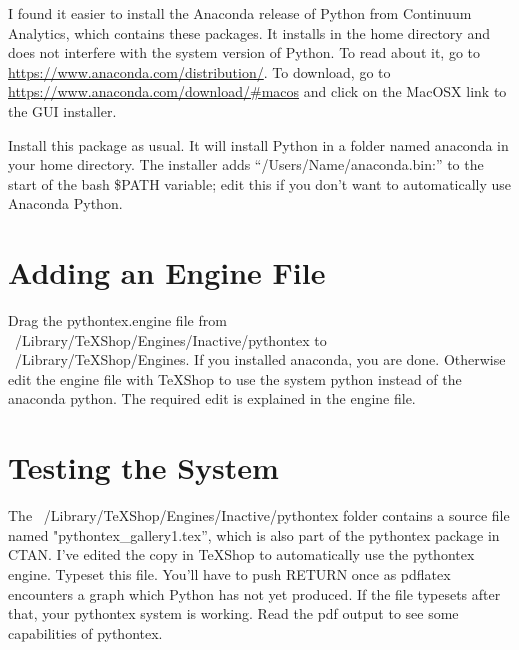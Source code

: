 \documentclass[11pt, oneside]{amsart}
\begin{document}
I found it easier to install the Anaconda release of Python from Continuum Analytics, which contains these packages. It installs in the home directory and does not interfere with the system version of Python. To read about it, go to \href{https://www.anaconda.com/distribution/}{https://www.anaconda.com/distribution/}. To download, go to \href{https://www.anaconda.com/download/\#macos}{https://www.anaconda.com/download/\#macos} and click on the MacOSX link to the GUI installer.

Install  this package as usual. It will install Python in a folder named anaconda in your home directory. The installer adds ``/Users/Name/anaconda.bin:'' to the start of the bash \$PATH variable;
edit this if you don't want to automatically use Anaconda Python.

\section{Adding an Engine File}
Drag the pythontex.engine file from ~/Library/TeXShop/Engines/Inactive/pythontex to ~/Library/TeXShop/Engines. If you installed anaconda, you are done. Otherwise edit the engine file with TeXShop to use the system python instead of the anaconda python. The required edit is explained in the engine file.

\section{Testing the System}
The ~/Library/TeXShop/Engines/Inactive/pythontex folder contains a source file named "pythontex\_gallery1.tex'', which is also part of the pythontex package in CTAN. I've edited
the copy in TeXShop to automatically use the pythontex engine. Typeset this file. You'll
have to push RETURN once as pdflatex encounters a graph which Python has not yet produced. If the file
typesets after that, your pythontex system is working. Read the pdf output to see some capabilities of pythontex.
\end{document}

